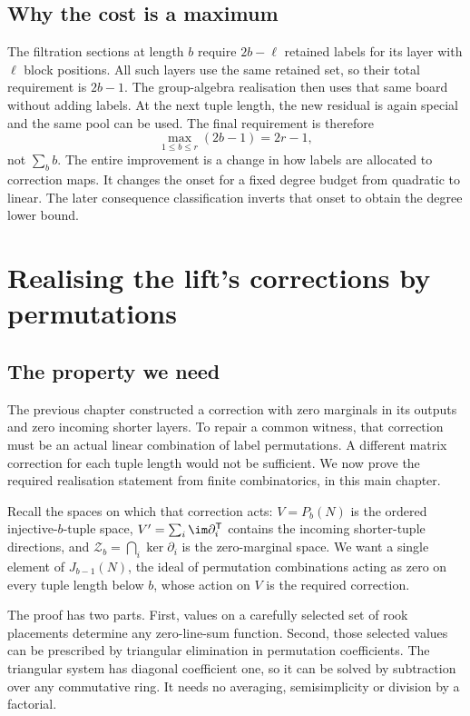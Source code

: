 \documentclass[11pt,a4paper,oneside,openany]{book}
\theoremstyle{definition}\newtheorem{definition}[theorem]{Definition}
\theoremstyle{remark}\newtheorem{remark}[theorem]{Remark}
\numberwithin{equation}{chapter}
\begin{document}
\section*{Why the cost is a maximum}
The filtration sections at length $b$ require $2b-\ell$ retained labels
for its layer with $\ell$ block positions. All such layers use the same
retained set, so their total requirement is $2b-1$. The group-algebra
realisation then uses that same board without adding labels. At the
next tuple length, the new residual is again special and the same
pool can be used. The final requirement is therefore
\[
                 \max_{1\le b\le r}(2b-1)=2r-1,
\]
not $\sum_b b$. The entire improvement is a change in how labels
are allocated to correction maps. It changes the onset for a fixed
degree budget from quadratic to linear. The later consequence
classification inverts that onset to obtain the degree lower bound.

\chapter{Realising the lift's corrections by permutations}\label{tx:sec:rook-realization}
\label{tx:ch:rooks}
\section*{The property we need}
The previous chapter constructed a correction with zero marginals in
its outputs and zero incoming shorter layers. To repair a common
witness, that correction must be an actual linear combination of
label permutations. A different matrix correction for each tuple
length would not be sufficient. We now prove the required realisation
statement from finite combinatorics, in this main chapter.

Recall the spaces on which that correction acts:
$V=P_b(N)$ is the ordered injective-$b$-tuple space,
$V'=\sum_i\im\partial_i^{\mathsf T}$ contains the incoming
shorter-tuple directions, and $\mathcal Z_b=\bigcap_i\ker\partial_i$
is the zero-marginal space. We want a single element of
$J_{b-1}(N)$, the ideal of permutation combinations acting as zero
on every tuple length below $b$, whose action on $V$ is the required
correction.

The proof has two parts. First, values on a carefully selected set
of rook placements determine any zero-line-sum function. Second,
those selected values can be prescribed by triangular elimination
in permutation coefficients. The triangular system has diagonal
coefficient one, so it can be solved by subtraction over any
commutative ring. It needs no averaging, semisimplicity or division
by a factorial.
\end{document}
